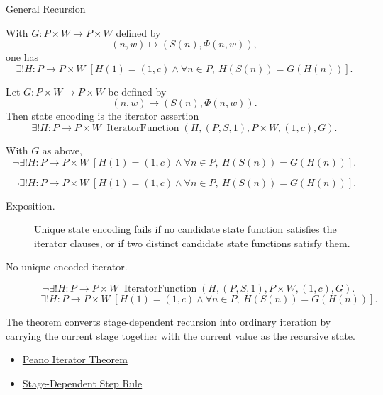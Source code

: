 \begin{topicbox}{General Recursion}
\begin{remark*}
With $G\colon P\times W\to P\times W$ defined by
\[
(n,w)\mapsto (S(n),\Phi(n,w)),
\]
one has
\[
\exists! H\colon P\to P\times W\;
\left[
H(1)=(1,c)\land
\forall n\in P,\ H(S(n))=G(H(n))
\right].
\]
\end{remark*}

\begin{remark*}
Let $G\colon P\times W\to P\times W$ be defined by
\[
(n,w)\mapsto (S(n),\Phi(n,w)).
\]
Then state encoding is the iterator assertion
\[
\exists! H\colon P\to P\times W\;
\operatorname{IteratorFunction}(H,(P,S,1),P\times W,(1,c),G).
\]
\end{remark*}

\begin{remark*}
With $G$ as above,
\[
\neg\exists! H\colon P\to P\times W\;
\left[
H(1)=(1,c)\land
\forall n\in P,\ H(S(n))=G(H(n))
\right].
\]
\end{remark*}

\begin{remark*}
\[
\neg\exists! H\colon P\to P\times W\;
\left[
H(1)=(1,c)\land
\forall n\in P,\ H(S(n))=G(H(n))
\right].
\]
\end{remark*}

\begin{remark*}
\begin{description}
  \item[Exposition.]
  Unique state encoding fails if no candidate state function satisfies the
  iterator clauses, or if two distinct candidate state functions satisfy them.
  \item[No unique encoded iterator.]
  \[
  \neg\exists! H\colon P\to P\times W\;
  \operatorname{IteratorFunction}(H,(P,S,1),P\times W,(1,c),G).
  \]
  \[
  \neg\exists! H\colon P\to P\times W\;
  \left[
  H(1)=(1,c)\land
  \forall n\in P,\ H(S(n))=G(H(n))
  \right].
  \]
\end{description}
\end{remark*}

\begin{remark*}[Interpretation]
The theorem converts stage-dependent recursion into ordinary iteration by
carrying the current stage together with the current value as the recursive
state.
\end{remark*}

\begin{dependencies}
\begin{itemize}
  \item \hyperref[thm:peano-iterator-theorem]{Peano Iterator Theorem}
  \item \hyperref[def:stage-dependent-step-rule]{Stage-Dependent Step Rule}
\end{itemize}
\end{dependencies}


\end{topicbox}
